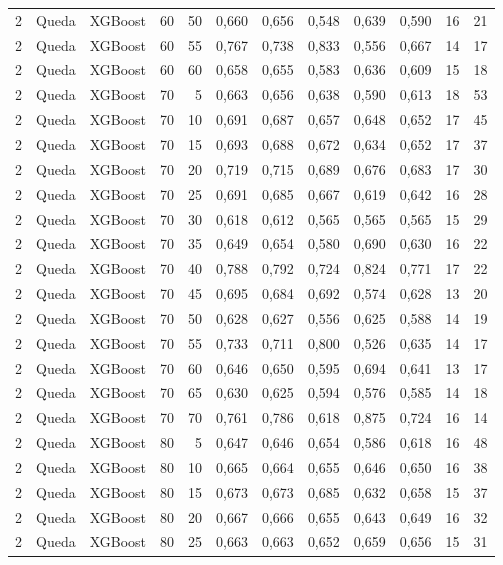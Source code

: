 \begin{longtable}{@{}rllrrrrrrrrr@{}}
2 & Queda & XGBoost & 60 & 50 & 0,660 & 0,656 & 0,548 & 0,639 & 0,590 & 16 & 21 \\
2 & Queda & XGBoost & 60 & 55 & 0,767 & 0,738 & 0,833 & 0,556 & 0,667 & 14 & 17 \\
2 & Queda & XGBoost & 60 & 60 & 0,658 & 0,655 & 0,583 & 0,636 & 0,609 & 15 & 18 \\
2 & Queda & XGBoost & 70 & 5 & 0,663 & 0,656 & 0,638 & 0,590 & 0,613 & 18 & 53 \\
2 & Queda & XGBoost & 70 & 10 & 0,691 & 0,687 & 0,657 & 0,648 & 0,652 & 17 & 45 \\
2 & Queda & XGBoost & 70 & 15 & 0,693 & 0,688 & 0,672 & 0,634 & 0,652 & 17 & 37 \\
2 & Queda & XGBoost & 70 & 20 & 0,719 & 0,715 & 0,689 & 0,676 & 0,683 & 17 & 30 \\
2 & Queda & XGBoost & 70 & 25 & 0,691 & 0,685 & 0,667 & 0,619 & 0,642 & 16 & 28 \\
2 & Queda & XGBoost & 70 & 30 & 0,618 & 0,612 & 0,565 & 0,565 & 0,565 & 15 & 29 \\
2 & Queda & XGBoost & 70 & 35 & 0,649 & 0,654 & 0,580 & 0,690 & 0,630 & 16 & 22 \\
2 & Queda & XGBoost & 70 & 40 & 0,788 & 0,792 & 0,724 & 0,824 & 0,771 & 17 & 22 \\
2 & Queda & XGBoost & 70 & 45 & 0,695 & 0,684 & 0,692 & 0,574 & 0,628 & 13 & 20 \\
2 & Queda & XGBoost & 70 & 50 & 0,628 & 0,627 & 0,556 & 0,625 & 0,588 & 14 & 19 \\
2 & Queda & XGBoost & 70 & 55 & 0,733 & 0,711 & 0,800 & 0,526 & 0,635 & 14 & 17 \\
2 & Queda & XGBoost & 70 & 60 & 0,646 & 0,650 & 0,595 & 0,694 & 0,641 & 13 & 17 \\
2 & Queda & XGBoost & 70 & 65 & 0,630 & 0,625 & 0,594 & 0,576 & 0,585 & 14 & 18 \\
2 & Queda & XGBoost & 70 & 70 & 0,761 & 0,786 & 0,618 & 0,875 & 0,724 & 16 & 14 \\
2 & Queda & XGBoost & 80 & 5 & 0,647 & 0,646 & 0,654 & 0,586 & 0,618 & 16 & 48 \\
2 & Queda & XGBoost & 80 & 10 & 0,665 & 0,664 & 0,655 & 0,646 & 0,650 & 16 & 38 \\
2 & Queda & XGBoost & 80 & 15 & 0,673 & 0,673 & 0,685 & 0,632 & 0,658 & 15 & 37 \\
2 & Queda & XGBoost & 80 & 20 & 0,667 & 0,666 & 0,655 & 0,643 & 0,649 & 16 & 32 \\
2 & Queda & XGBoost & 80 & 25 & 0,663 & 0,663 & 0,652 & 0,659 & 0,656 & 15 & 31 \\

\end{longtable}
